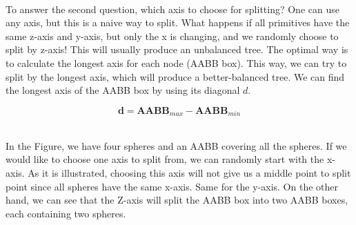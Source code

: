 \documentclass[11pt,a4paper]{article}
\begin{document}
\noindent
\\
To answer the second question, which axis to choose for splitting? One can use any axis, but this is a naive way to split. What happens if all primitives have the same z-axis and y-axis, but only the x is changing, and we randomly choose to split by z-axis! This will usually produce an unbalanced tree. The optimal way is to calculate the longest axis for each node (AABB box). This way, we can try to split by the longest axis, which will produce a better-balanced tree. We can find the longest axis of the AABB box by using its diagonal $d$.  

\begin{equation}
\textbf{d} = \textbf{AABB}_{max} - \textbf{AABB}_{min}
\end{equation}

\noindent
\\
In the Figure, we have four spheres and an AABB covering all the spheres. If we would like to choose one axis to split from, we can randomly start with the x-axis. As it is illustrated, choosing this axis will not give us a middle point to split point since all spheres have the same x-axis. Same for the y-axis. On the other hand, we can see that the Z-axis will split the AABB box into two AABB boxes, each containing two spheres. 
\end{document}
